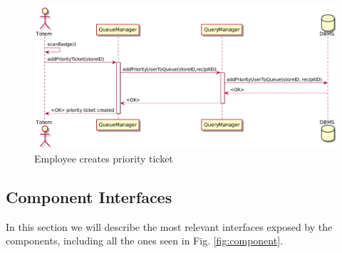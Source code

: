 \begin{figure}[H]
    \includegraphics[width=\linewidth]{uml/seq_priority_ticket_creation.png}
    \caption{Employee creates priority ticket}
    \label{fig:seq_priority_ticket}
\end{figure}

\newpage

\subsection{Component Interfaces}
In this section we will describe the most relevant interfaces exposed by the components, including all the ones seen in Fig. \ref{fig:component}.

